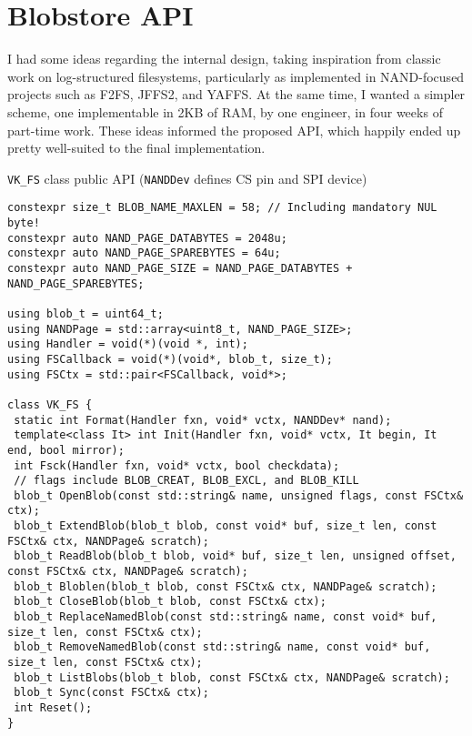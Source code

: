 \documentclass[letterpaper,10pt]{article}
\begin{document}
\section{Blobstore API}
I had some ideas regarding the internal design, taking inspiration from
classic work on log-structured filesystems\parencite{sprite}, particularly
as implemented in NAND-focused projects such as F2FS\parencite{f2fs},
JFFS2\parencite{jffs}, and YAFFS\parencite{yaffs}. At the same time, I wanted
a simpler scheme, one implementable in 2KB of RAM, by one engineer, in four
weeks of part-time work. These ideas informed the proposed API, which happily
ended up pretty well-suited to the final implementation.

\begin{listing}[ht]
\caption{{\texttt{VK\_FS}} class public API ({\texttt{NANDDev}} defines CS pin and SPI device)}
\begin{verbatim}
constexpr size_t BLOB_NAME_MAXLEN = 58; // Including mandatory NUL byte!
constexpr auto NAND_PAGE_DATABYTES = 2048u;
constexpr auto NAND_PAGE_SPAREBYTES = 64u;
constexpr auto NAND_PAGE_SIZE = NAND_PAGE_DATABYTES + NAND_PAGE_SPAREBYTES;

using blob_t = uint64_t;
using NANDPage = std::array<uint8_t, NAND_PAGE_SIZE>;
using Handler = void(*)(void *, int);
using FSCallback = void(*)(void*, blob_t, size_t);
using FSCtx = std::pair<FSCallback, void*>;

class VK_FS {
 static int Format(Handler fxn, void* vctx, NANDDev* nand);
 template<class It> int Init(Handler fxn, void* vctx, It begin, It end, bool mirror);
 int Fsck(Handler fxn, void* vctx, bool checkdata);
 // flags include BLOB_CREAT, BLOB_EXCL, and BLOB_KILL
 blob_t OpenBlob(const std::string& name, unsigned flags, const FSCtx& ctx);
 blob_t ExtendBlob(blob_t blob, const void* buf, size_t len, const FSCtx& ctx, NANDPage& scratch);
 blob_t ReadBlob(blob_t blob, void* buf, size_t len, unsigned offset, const FSCtx& ctx, NANDPage& scratch);
 blob_t Bloblen(blob_t blob, const FSCtx& ctx, NANDPage& scratch);
 blob_t CloseBlob(blob_t blob, const FSCtx& ctx);
 blob_t ReplaceNamedBlob(const std::string& name, const void* buf, size_t len, const FSCtx& ctx);
 blob_t RemoveNamedBlob(const std::string& name, const void* buf, size_t len, const FSCtx& ctx);
 blob_t ListBlobs(blob_t blob, const FSCtx& ctx, NANDPage& scratch);
 blob_t Sync(const FSCtx& ctx);
 int Reset();
}
\end{verbatim}
\end{listing}
\end{document}
